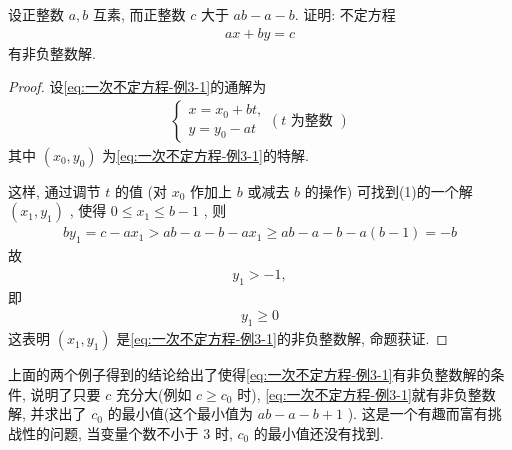 \begin{example}
	设正整数 $a ,  b$ 互素, 而正整数 $c$ 大于 $a b-a-b$. 证明: 不定方程
	\begin{align}\label{eq:一次不定方程-例3-1}
		a x+b y=c
	\end{align}
	有非负整数解.
\end{example}
\begin{proof}
	设\autoref{eq:一次不定方程-例3-1}的通解为
	\begin{align*}
		\left\{\begin{array}{l}
			       x=x_{0}+b t, \\
			       y=y_{0}-a t
		       \end{array}(t \text { 为整数 })\right.
	\end{align*}
	其中 $\left(x_{0}, y_{0}\right)$ 为\autoref{eq:一次不定方程-例3-1}的特解.

	这样, 通过调节 $t$ 的值 (对 $x_{0}$ 作加上 $b$ 或减去 $b$ 的操作) 可找到(1)的一个解 $\left(x_{1}, y_{1}\right)$ , 使得 $0 \leqslant x_{1} \leqslant b-1$ , 则
	\begin{align*}
		b y_{1}=c-a x_{1}>a b-a-b-a x_{1} \geqslant a b-a-b-a(b-1)=-b
	\end{align*}
	故
	\begin{align*}
		y_{1}>-1,
	\end{align*}
	即
	\begin{align*}
		y_{1} \geqslant 0
	\end{align*}
	这表明 $\left(x_{1}, y_{1}\right)$ 是\autoref{eq:一次不定方程-例3-1}的非负整数解, 命题获证.
\end{proof}
\begin{note}
	上面的两个例子得到的结论给出了使得\autoref{eq:一次不定方程-例3-1}有非负整数解的条件, 说明了只要 $c$ 充分大(例如 $c \geqslant c_{0}$ 时), \autoref{eq:一次不定方程-例3-1}就有非负整数解, 并求出了 $c_{0}$ 的最小值(这个最小值为 $a b-a-b+1$ ). 这是一个有趣而富有挑战性的问题, 当变量个数不小于 3 时, $c_{0}$ 的最小值还没有找到.
\end{note}

